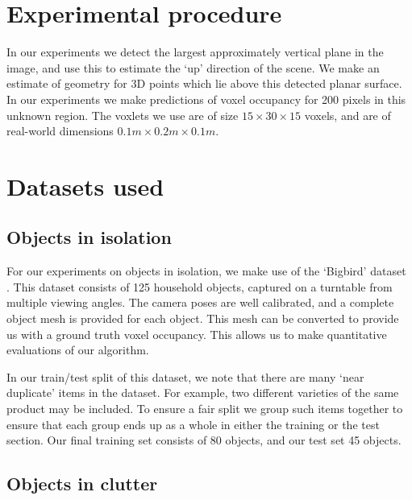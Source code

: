 \documentclass[10pt,twocolumn,letterpaper]{article}
\newcommand{\note}[1]{\textcolor{blue}{NOTE: #1}}
\begin{document}
\section{Experimental procedure}

In our experiments we detect the largest approximately vertical plane in the image, and use this to estimate the `up' direction of the scene.
We make an estimate of geometry for 3D points which lie above this detected planar surface.
In our experiments we make predictions of voxel occupancy for 200 pixels in this unknown region.
The voxlets we use are of size $15 \times 30 \times 15$ voxels, and are of real-world dimensions $0.1m \times 0.2m \times 0.1m$.



\section{Datasets used}


\subsection{Objects in isolation}

For our experiments on objects in isolation, we make use of the `Bigbird' dataset \cite{singh-icra-2014}. 
This dataset consists of 125 household objects, captured on a turntable from multiple viewing angles.
The camera poses are well calibrated, and a complete object mesh is provided for each object.
This mesh can be converted to provide us with a ground truth voxel occupancy.
This allows us to make quantitative evaluations of our algorithm.

In our train/test split of this dataset, we note that there are many `near duplicate' items in the dataset.
For example, two different varieties of the same product may be included.
To ensure a fair split we group such items together to ensure that each group ends up as a whole in either the training or the test section.
Our final training set consists of 80 objects, and our test set 45 objects.

\subsection{Objects in clutter}
\end{document}

